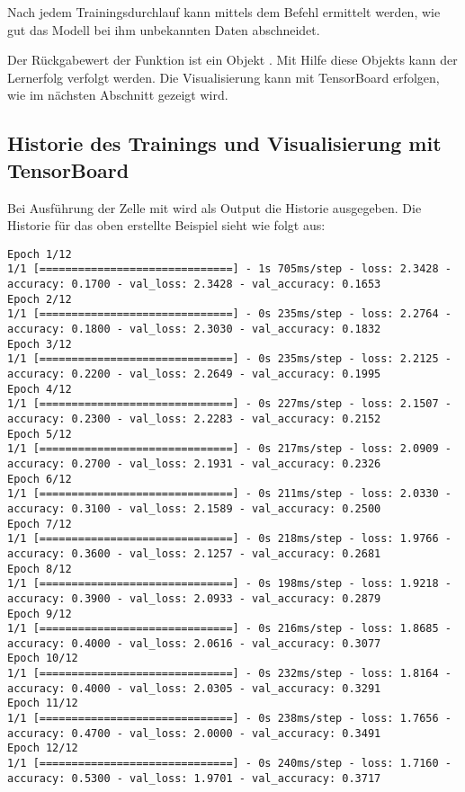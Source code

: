 Nach jedem Trainingsdurchlauf kann mittels dem Befehl 
ermittelt werden, wie gut das Modell bei ihm unbekannten Daten abschneidet.

Der Rückgabewert der Funktion  ist ein Objekt . Mit Hilfe diese Objekts kann der Lernerfolg verfolgt werden. Die Visualisierung kann mit TensorBoard erfolgen, wie im nächsten Abschnitt gezeigt wird.


\subsection{Historie des Trainings und Visualisierung mit TensorBoard}

Bei Ausführung der Zelle mit  wird als Output die Historie ausgegeben. Die Historie für das oben erstellte Beispiel sieht wie folgt aus:

\begin{lstlisting}[numbers=none]
Epoch 1/12
1/1 [==============================] - 1s 705ms/step - loss: 2.3428 - accuracy: 0.1700 - val_loss: 2.3428 - val_accuracy: 0.1653
Epoch 2/12
1/1 [==============================] - 0s 235ms/step - loss: 2.2764 - accuracy: 0.1800 - val_loss: 2.3030 - val_accuracy: 0.1832
Epoch 3/12
1/1 [==============================] - 0s 235ms/step - loss: 2.2125 - accuracy: 0.2200 - val_loss: 2.2649 - val_accuracy: 0.1995
Epoch 4/12
1/1 [==============================] - 0s 227ms/step - loss: 2.1507 - accuracy: 0.2300 - val_loss: 2.2283 - val_accuracy: 0.2152
Epoch 5/12
1/1 [==============================] - 0s 217ms/step - loss: 2.0909 - accuracy: 0.2700 - val_loss: 2.1931 - val_accuracy: 0.2326
Epoch 6/12
1/1 [==============================] - 0s 211ms/step - loss: 2.0330 - accuracy: 0.3100 - val_loss: 2.1589 - val_accuracy: 0.2500
Epoch 7/12
1/1 [==============================] - 0s 218ms/step - loss: 1.9766 - accuracy: 0.3600 - val_loss: 2.1257 - val_accuracy: 0.2681
Epoch 8/12
1/1 [==============================] - 0s 198ms/step - loss: 1.9218 - accuracy: 0.3900 - val_loss: 2.0933 - val_accuracy: 0.2879
Epoch 9/12
1/1 [==============================] - 0s 216ms/step - loss: 1.8685 - accuracy: 0.4000 - val_loss: 2.0616 - val_accuracy: 0.3077
Epoch 10/12
1/1 [==============================] - 0s 232ms/step - loss: 1.8164 - accuracy: 0.4000 - val_loss: 2.0305 - val_accuracy: 0.3291
Epoch 11/12
1/1 [==============================] - 0s 238ms/step - loss: 1.7656 - accuracy: 0.4700 - val_loss: 2.0000 - val_accuracy: 0.3491
Epoch 12/12
1/1 [==============================] - 0s 240ms/step - loss: 1.7160 - accuracy: 0.5300 - val_loss: 1.9701 - val_accuracy: 0.3717
\end{lstlisting}

